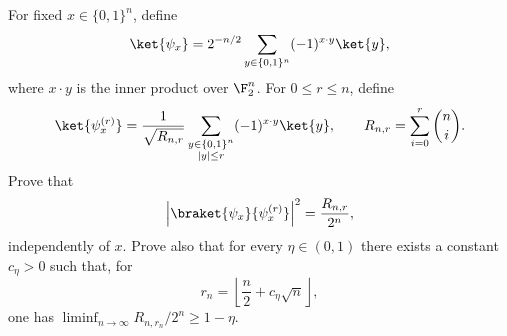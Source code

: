 For fixed $x\in\{0,1\}^n$, define
$$
    \ket{\psi_x}=2^{-n/2}\sum_{y\in\{0,1\}^n}(-1)^{x\cdot y}\ket{y},
$$
where $x\cdot y$ is the inner product over $\F_2^n$.  For $0\leq r\leq n$, define
$$
    \ket{\psi_x^{(r)}}=\frac{1}{\sqrt{R_{n,r}}}
    \sum_{\substack{y\in\{0,1\}^n\\ |y|\leq r}}(-1)^{x\cdot y}\ket{y},
    \qquad
    R_{n,r}=\sum_{i=0}^r\binom{n}{i}.
$$
Prove that
$$
    \left|\braket{\psi_x}{\psi_x^{(r)}}\right|^2=\frac{R_{n,r}}{2^n},
$$
independently of $x$.  Prove also that for every $\eta\in(0,1)$ there exists a constant $c_\eta>0$ such that, for
$$
    r_n=\left\lfloor \frac n2+c_\eta\sqrt n\right\rfloor,
$$
one has $\liminf_{n\to\infty}R_{n,r_n}/2^n\geq 1-\eta$.
